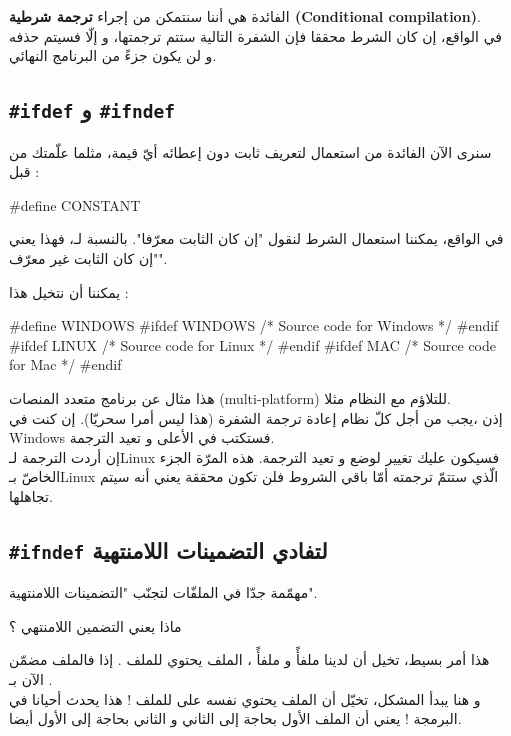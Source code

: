 الفائدة هي أننا سنتمكن من إجراء
\textbf{ترجمة شرطية
(\textenglish{Conditional compilation})}.\\
في الواقع، إن كان الشرط محققا فإن الشفرة التالية ستتم ترجمتها، و إلّا فسيتم حذفه و لن يكون جزءً من البرنامج النهائي.

\subsection{
\texttt{\#ifdef}
و
\texttt{\#ifndef}
}
سنرى الآن الفائدة من استعمال
لتعريف ثابت دون إعطائه أيّ قيمة، مثلما علّمتك من قبل :
\begin{Csource}
#define CONSTANT
\end{Csource}
في الواقع، يمكننا استعمال الشرط
لنقول "إن كان الثابت معرّفا".
بالنسبة لـ،
فهذا يعني "إن كان الثابت غير معرّف".

يمكننا أن نتخيل هذا :
\begin{Csource}
#define WINDOWS
#ifdef WINDOWS
  /* Source code for Windows */
#endif
#ifdef LINUX
  /* Source code for Linux */
#endif
#ifdef MAC
  /* Source code for Mac */
#endif
\end{Csource}
هذا مثال عن برنامج متعدد المنصات
(\textenglish{multi-platform})
للتلاؤم مع النظام مثلا.\\
إذن ،يجب من أجل كلّ نظام إعادة ترجمة الشفرة (هذا ليس أمرا سحريّا).
إن كنت في
\textenglish{Windows}
فستكتب
في الأعلى و تعيد الترجمة.\\
إن أردت الترجمة لـ\textenglish{Linux}
فسيكون عليك تغيير
لوضع
و تعيد الترجمة. هذه المرّة الجزء الخاصّ بـ\textenglish{Linux}
الّذي ستتمّ ترجمته أمّا باقي الشروط فلن تكون محققة يعني أنه سيتم تجاهلها.

\subsection{\texttt{\#ifndef} لتفادي التضمينات اللامنتهية}
مهمّمة جدّا في الملفّات
لتجنّب "التضمينات اللامنتهية".
\begin{question}
  ماذا يعني التضمين اللامنتهي ؟
\end{question}
هذا أمر بسيط، تخيل أن لدينا ملفأً
و ملفأً
،
الملف
يحتوي
للملف
.
إذا فالملف
مضمّن الآن بـ
.\\
و هنا يبدأ المشكل، تخيّل أن الملف
يحتوي نفسه على
للملف
 !
هذا يحدث أحيانا في البرمجة ! يعني أن الملف الأول بحاجة إلى الثاني و الثاني بحاجة إلى الأول أيضا.

